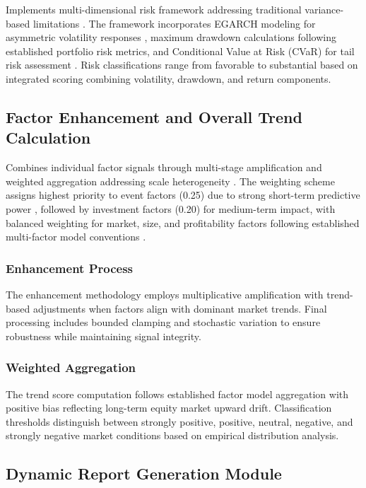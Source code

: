 \documentclass[3p,times,procedia]{elsarticle}
\begin{document}
Implements multi-dimensional risk framework addressing traditional variance-based limitations \cite{Jorion2001,Rockafellar2000}. The framework incorporates EGARCH modeling for asymmetric volatility responses \cite{Nelson1991}, maximum drawdown calculations following established portfolio risk metrics, and Conditional Value at Risk (CVaR) for tail risk assessment \cite{Rockafellar2000}. Risk classifications range from favorable to substantial based on integrated scoring combining volatility, drawdown, and return components.

\subsection{{Factor Enhancement and Overall Trend Calculation}}

Combines individual factor signals through multi-stage amplification and weighted aggregation addressing scale heterogeneity \cite{Harvey2016,FAMA1993}. The weighting scheme assigns highest priority to event factors (0.25) due to strong short-term predictive power \cite{Daniel1998}, followed by investment factors (0.20) for medium-term impact, with balanced weighting for market, size, and profitability factors following established multi-factor model conventions \cite{FAMA1993,Carhart1997}.

\subsubsection{{Enhancement Process}}

The enhancement methodology employs multiplicative amplification with trend-based adjustments when factors align with dominant market trends. Final processing includes bounded clamping and stochastic variation to ensure robustness while maintaining signal integrity.

\subsubsection{{Weighted Aggregation}}

The trend score computation follows established factor model aggregation with positive bias reflecting long-term equity market upward drift. Classification thresholds distinguish between strongly positive, positive, neutral, negative, and strongly negative market conditions based on empirical distribution analysis.

\subsection{Dynamic Report Generation Module}
\end{document}
